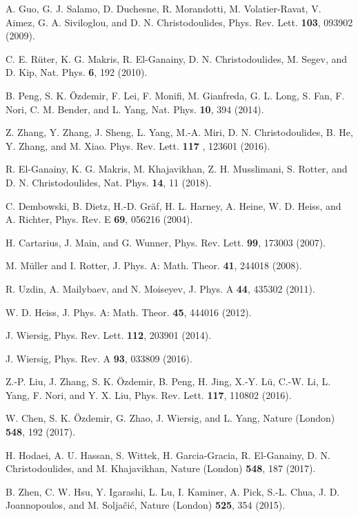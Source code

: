 \documentclass[prl,showpacs,superscriptaddress,twocolumn]{revtex4-1}
\begin{document}
\begin{thebibliography}{999}
 A. Guo, G. J. Salamo, D. Duchesne, R. Morandotti, M.
Volatier-Ravat, V. Aimez, G. A. Siviloglou, and D. N. Christodoulides, Phys.
Rev. Lett. \textbf{103}, 093902 (2009).

 C. E. R\"{u}ter, K. G. Makris, R. El-Ganainy, D. N.
Christodoulides, M. Segev, and D. Kip, Nat. Phys. \textbf{6}, 192 (2010).

 B. Peng, S. K. \"{O}zdemir, F. Lei, F. Monifi, M. Gianfreda, G.
L. Long, S. Fan, F. Nori, C. M. Bender, and L. Yang, Nat. Phys. \textbf{10},
394 (2014).

 Z. Zhang, Y. Zhang, J. Sheng, L. Yang, M.-A. Miri, D. N.
Christodoulides, B. He, Y. Zhang, and M. Xiao. Phys. Rev. Lett. \textbf{117}%
, 123601 (2016).

 R. El-Ganainy, K. G. Makris, M. Khajavikhan, Z. H.
Musslimani, S. Rotter, and D. N. Christodoulides, Nat. Phys. \textbf{14}, 11
(2018).

 C. Dembowski, B. Dietz, H.-D. Gr\"{a}f, H. L. Harney, A.
Heine, W. D. Heiss, and A. Richter, Phys. Rev. E \textbf{69}, 056216 (2004).

 H. Cartarius, J. Main, and G. Wunner, Phys. Rev. Lett.
\textbf{99}, 173003 (2007).

 M. M\"{u}ller and I. Rotter, J. Phys. A: Math. Theor.
\textbf{41}, 244018 (2008).

 R. Uzdin, A. Mailybaev, and N. Moiseyev, J. Phys. A \textbf{%
44}, 435302 (2011).

 W. D. Heiss, J. Phys. A: Math. Theor. \textbf{45}, 444016
(2012).

 J. Wiersig, Phys. Rev. Lett. \textbf{112}, 203901 (2014).

 J. Wiersig, Phys. Rev. A \textbf{93}, 033809 (2016).

 Z.-P. Liu, J. Zhang, S. K. \"{O}zdemir, B. Peng, H. Jing,
X.-Y. L\"{u}, C.-W. Li, L. Yang, F. Nori, and Y. X. Liu, Phys. Rev. Lett.
\textbf{117}, 110802 (2016).

 W. Chen, S. K. \"{O}zdemir, G. Zhao, J. Wiersig, and L.
Yang, Nature (London) \textbf{548}, 192 (2017).

 H. Hodaei, A. U. Hassan, S. Wittek, H. Garcia-Gracia,
R. El-Ganainy, D. N. Christodoulides, and M. Khajavikhan, Nature (London)
\textbf{548}, 187 (2017).

 B. Zhen, C. W. Hsu, Y. Igarashi, L. Lu, I. Kaminer, A. Pick,
S.-L. Chua, J. D. Joannopoulos, and M. Solja\v{c}i\'{c}, Nature (London)
\textbf{525}, 354 (2015).


\end{thebibliography}
\end{document}
